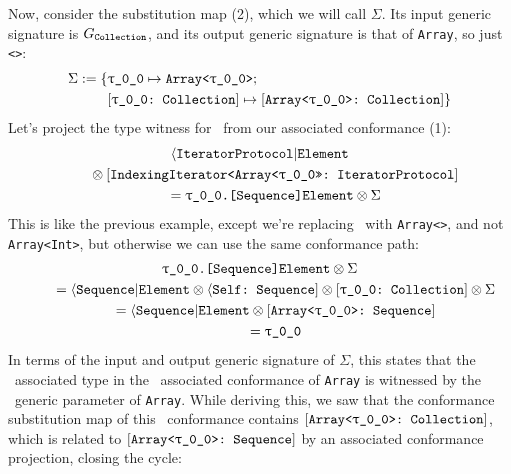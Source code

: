 \documentclass[../generics]{subfiles}
\begin{document}
\begin{example}
Now, consider the substitution map (2), which we will call $\Sigma$. Its input generic signature is $G_{\texttt{Collection}}$, and its output generic signature is that of \texttt{Array}, so just \texttt{<\rT>}:
\begin{align*}
\Sigma := \SubstMapC{&\SubstType{\rT}{Array<\rT>}}{\\
&\SubstConf{\rT}{Array<\rT>}{Collection}}
\end{align*}
Let's project the type witness for \nElement\ from our associated conformance (1):
\begin{gather*}
\AIElement \\
\qquad {} \otimes \ConfReq{IndexingIterator<Array<\rT>>}{IteratorProtocol} \\
\qquad {} = \texttt{\rT.[Sequence]Element} \otimes \Sigma
\end{gather*}
This is like the previous example, except we're replacing \rT\ with \texttt{Array<\rT>}, and not \texttt{Array<Int>}, but otherwise we can use the same conformance path:
\begin{gather*}
\texttt{\rT.[Sequence]Element} \otimes \Sigma \\
\qquad {} = \AElement \otimes \AssocConf{Self}{Sequence} \otimes \ConfReq{\rT}{Collection} \otimes \Sigma \\
\qquad {} = \AElement \otimes \ArraySequence \\
\qquad {} = \rT
\end{gather*}
In terms of the input and output generic signature of $\Sigma$, this states that the \nElement\ associated type in the \nIterator\ associated conformance of \texttt{Array} is witnessed by the \nElement\ generic parameter of \texttt{Array}. While deriving this, we saw that the conformance substitution map of this \nIterator\ conformance contains $\ArrayCollection$, which is related to $\ArraySequence$ by an associated conformance projection, closing the cycle:
\end{example}

\medskip
\end{document}
